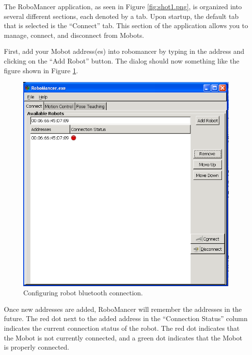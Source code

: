 \documentclass{article}
\begin{document}
The RoboMancer application, as seen in Figure \ref{fig:shot1.png}, is organized into
several different sections, each denoted by a tab. Upon startup, the default tab
that is selected is the ``Connect'' tab. This section of the application allows
you to manage, connect, and disconnect from Mobots. 

First, add your Mobot address(es) into robomancer by typing in the address and
clicking on the ``Add Robot'' button. The dialog should now something like
the figure shown in Figure \ref{fig:shot3.png}.

\begin{figure}[H]
\begin{center}
\includegraphics[width=4.5in]{images/robomancer_screenshot3.png}
\end{center}
\caption{\label{fig:shot3.png} Configuring robot bluetooth connection.}
\end{figure}

Once new addresses are added, RoboMancer will remember the addresses in the future. 
The red dot next to the added address in the ``Connection Status'' column indicates
the current connection status of the robot. The red dot indicates that the Mobot
is not currently connected, and a green dot indicates that the Mobot is 
properly connected. 
\end{document}
